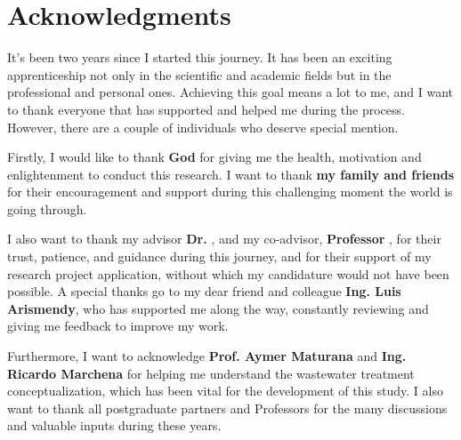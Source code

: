 \chapter*{Acknowledgments}

It’s been two years since I started this journey. It has been an exciting apprenticeship not only in the scientific and academic fields but in the professional and personal ones. Achieving this goal means a lot to me, and I want to thank everyone that has supported and helped me during the process. However, there are a couple of individuals who deserve special mention.

Firstly, I would like to thank \textbf{God} for giving me the health, motivation and enlightenment to conduct this research. I want to thank \textbf{my family and friends} for their encouragement and support during this challenging moment the world is going through.

I also want to thank my advisor \textbf{Dr.} \textbf{\myProfFirstName} \textbf{\myProfLastName}, and my co-advisor, \textbf{Professor} \textbf{\myOtherProfFirstName} \textbf{\myOtherProfLastName}, for their trust, patience, and guidance during this journey, and for their support of my research project application, without which my candidature would not have been possible. A special thanks go to my dear friend and colleague \textbf{Ing. Luis Arismendy}, who has supported me along the way, constantly reviewing and giving me feedback to improve my work.

Furthermore, I want to acknowledge \textbf{Prof. Aymer Maturana} and \textbf{Ing. Ricardo Marchena} for helping me understand the wastewater treatment conceptualization, which has been vital for the development of this study. I also want to thank all postgraduate partners and Professors for the many discussions and valuable inputs during these years. 




